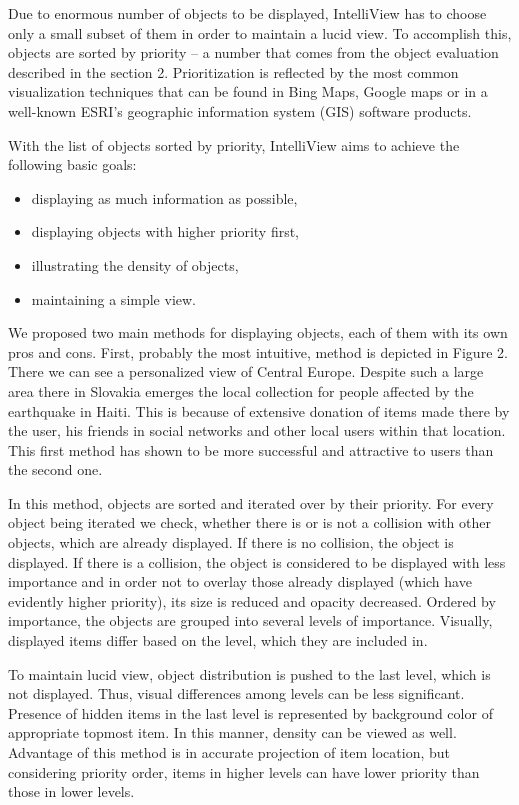 \documentclass[10pt]{article}
\begin{document}
 

Due to enormous number of objects to be displayed, IntelliView has to choose only a small subset of them in order to maintain a lucid view. To accomplish this, objects are sorted by priority – a number that comes from the object evaluation described in the section 2. Prioritization is reflected by the most common visualization techniques that can be found in Bing Maps, Google maps or in a well-known ESRI’s geographic information system (GIS) software products.

With the list of objects sorted by priority, IntelliView aims to achieve the following basic goals:

\begin{itemize}
\item{displaying as much information as possible,}
\item{displaying objects with higher priority first,}
\item{illustrating the density of objects,}
\item{maintaining a simple view.}
\end{itemize}



We proposed two main methods for displaying objects, each of them with its own pros and cons. First, probably the most intuitive, method is depicted in Figure 2. There we can see a personalized view of Central Europe. Despite such a large area there in Slovakia emerges the local collection for people affected by the earthquake in Haiti. This is because of extensive donation of items made there by the user, his friends in social networks and other local users within that location. This first method has shown to be more successful and attractive to users than the second one.

In this method, objects are sorted and iterated over by their priority. For every object being iterated we check, whether there is or is not a collision with other objects, which are already displayed. If there is no collision, the object is displayed. If there is a collision, the object is considered to be displayed with less importance and in order not to overlay those already displayed (which have evidently higher priority), its size is reduced and opacity decreased. Ordered by importance, the objects are grouped into several levels of importance. Visually, displayed items differ based on the level, which they are included in.

To maintain lucid view, object distribution is pushed to the last level, which is not displayed. Thus, visual differences among levels can be less significant. Presence of hidden items in the last level is represented by background color of appropriate topmost item. In this manner, density can be viewed as well. Advantage of this method is in accurate projection of item location, but considering priority order, items in higher levels can have lower priority than those in lower levels.
\end{document}
